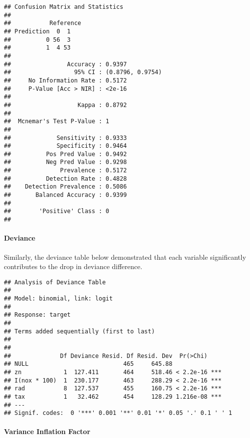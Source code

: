 \documentclass[]{article}
\let\oldparagraph\paragraph
\renewcommand{\paragraph}[1]{\oldparagraph{#1}\mbox{}}
\begin{document}
\begin{verbatim}
## Confusion Matrix and Statistics
## 
##           Reference
## Prediction  0  1
##          0 56  3
##          1  4 53
##                                           
##                Accuracy : 0.9397          
##                  95% CI : (0.8796, 0.9754)
##     No Information Rate : 0.5172          
##     P-Value [Acc > NIR] : <2e-16          
##                                           
##                   Kappa : 0.8792          
##                                           
##  Mcnemar's Test P-Value : 1               
##                                           
##             Sensitivity : 0.9333          
##             Specificity : 0.9464          
##          Pos Pred Value : 0.9492          
##          Neg Pred Value : 0.9298          
##              Prevalence : 0.5172          
##          Detection Rate : 0.4828          
##    Detection Prevalence : 0.5086          
##       Balanced Accuracy : 0.9399          
##                                           
##        'Positive' Class : 0               
## 
\end{verbatim}

\hypertarget{deviance}{%
\paragraph{Deviance}\label{deviance}}

Similarly, the deviance table below demonstrated that each variable
significantly contributes to the drop in deviance difference.

\begin{verbatim}
## Analysis of Deviance Table
## 
## Model: binomial, link: logit
## 
## Response: target
## 
## Terms added sequentially (first to last)
## 
## 
##              Df Deviance Resid. Df Resid. Dev  Pr(>Chi)    
## NULL                           465     645.88              
## zn            1  127.411       464     518.46 < 2.2e-16 ***
## I(nox * 100)  1  230.177       463     288.29 < 2.2e-16 ***
## rad           8  127.537       455     160.75 < 2.2e-16 ***
## tax           1   32.462       454     128.29 1.216e-08 ***
## ---
## Signif. codes:  0 '***' 0.001 '**' 0.01 '*' 0.05 '.' 0.1 ' ' 1
\end{verbatim}

\hypertarget{variance-inflation-factor}{%
\paragraph{Variance Inflation Factor}\label{variance-inflation-factor}}
\end{document}
